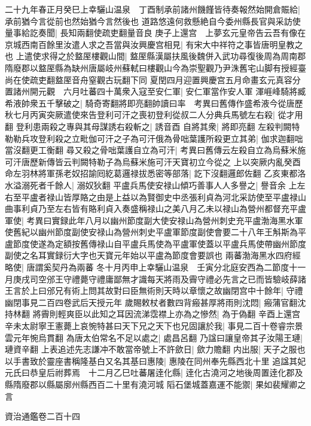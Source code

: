 二十九年春正月癸巳上幸驪山温泉　丁酉制承前諸州饑饉皆待奏報然始開倉賑給|{
	承前猶今言從前也然始猶今言然後也}
道路悠遠何救懸絶自今委州縣長官與采訪使量事給訖奏聞|{
	長知兩翻使疏吏翻量音良}
庚子上還宫　上夢玄元皇帝告云吾有像在京城西南百餘里汝遣人求之吾當與汝興慶宫相見|{
	有宋大中祥符之事皆唐明皇教之也}
上遣使求得之於盩厔樓觀山間|{
	盩厔縣漢屬扶風後魏併入武功尋復後周為周南郡隋廢郡以盩厔縣為缺州唐屬岐州蘇軾曰樓觀山今為崇聖觀乃尹洙舊宅山脚有授經臺尚在使疏吏翻盩厔音舟窒觀古玩翻下同}
夏閏四月迎置興慶宫五月命畫玄元真容分置諸州開元觀　六月吐蕃四十萬衆入寇至安仁軍|{
	安仁軍當作安人軍}
渾崕峰騎將臧希液帥衆五千擊破之|{
	騎奇寄翻將即亮翻帥讀曰率　考異曰舊傳作盛希液今從唐歷}
秋七月丙寅突厥遣使來告登利可汗之喪初登利從叔二人分典兵馬號左右殺|{
	從才用翻}
登利患兩殺之專與其母謀誘右殺斬之|{
	誘音酉}
自將其衆|{
	將即亮翻}
左殺判闕特勒勒兵攻登利殺之立毗伽可汗之子為可汗俄為骨咄葉護所殺更立其弟|{
	伽求迦翻咄當沒翻更工衡翻}
尋又殺之骨咄葉護自立為可汗|{
	考異曰舊傳云左殺自立為烏蘇米施可汗唐歷新傳皆云判闕特勒子為烏蘇米施可汗天寶初立今從之}
上以突厥内亂癸酉命左羽林將軍孫老奴招諭囘紇葛邏禄拔悉密等部落|{
	訖下沒翻邏郎佐翻}
乙亥東都洛水溢溺死者千餘人|{
	溺奴狄翻}
平盧兵馬使安禄山傾巧善事人人多譽之|{
	譽音余}
上左右至平盧者禄山皆厚賂之由是上益以為賢御史中丞張利貞為河北采訪使至平盧禄山曲事利貞乃至左右皆有賂利貞入奏盛稱禄山之美八月乙未以禄山為營州都督充平盧軍使|{
	考異曰實録此年八月以幽州節度副大使安禄山為營州刺史充平盧渤海黑水軍使舊紀以幽州節度副使安禄山為營州刺史平盧軍節度副使會要二十八年王斛斯為平盧節度使遂為定額按舊傳禄山自平盧兵馬使為平盧軍使蓋以平盧兵馬使帶幽州節度副使之名耳實録衍大字也天寶元年始以平盧為節度會要誤也}
兩蕃渤海黑水四府經略使|{
	唐謂奚契丹為兩蕃}
冬十月丙申上幸驪山温泉　壬寅分北庭安西為二節度十一月庚戌司空邠王守禮薨守禮庸鄙無才識每天將雨及霽守禮必先言之已而皆驗岐薛諸王言於上曰邠兄有術上問其故對曰臣無術則天時以章懷之故幽閉宫中十餘年|{
	守禮幽閉事見二百四卷武后天授元年}
歲賜敕杖者數四背瘢甚厚將雨則沈悶|{
	瘢蒲官翻沈持林翻}
將霽則輕爽臣以此知之耳因流涕霑襟上亦為之慘然|{
	為于偽翻}
辛酉上還宫　辛未太尉寧王憲薨上哀惋特甚曰天下兄之天下也兄固讓於我|{
	事見二百十卷睿宗景雲元年惋烏貫翻}
為唐太伯常名不足以處之|{
	處昌呂翻}
乃諡曰讓皇帝其子汝陽王璉|{
	璉資辛翻}
上表追述先志謙冲不敢當帝號上不許歛日|{
	歛力贍翻}
内出服|{
	天子之服也}
以手書致於靈座書稱隆基白又名其基曰惠陵|{
	惠陵在同州奉先縣西北十里}
追諡其妃元氏曰恭皇后祔葬焉　十二月乙巳吐蕃屠逹化縣|{
	逹化古澆河之地後周置逹化郡及縣隋廢郡以縣屬廓州縣西百二十里有澆河城}
䧟石堡城蓋嘉運不能禦|{
	果如裴耀卿之言}


資治通鑑卷二百十四
